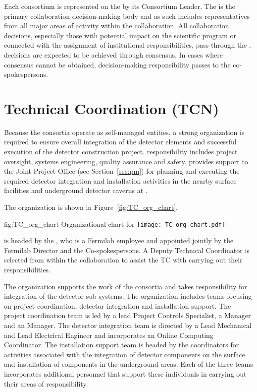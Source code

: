 Each consortium is represented on the   by
its Consortium Leader.  The   is the primary
collaboration decision-making body and as such includes
representatives from all major areas of activity within the
collaboration.  All collaboration decisions, especially those with
potential impact on the  scientific program or connected with the
assignment of institutional responsibilities, pass through the
.   decisions are expected to be
achieved through consensus.  In cases where consensus cannot be
obtained, decision-making responsibility passes to the
co-spokespersons.

\section{Technical Coordination (TCN)}
\label{sec:tc}

Because the consortia operate as self-managed entities, a strong
 organization is required to ensure 
overall integration of the detector elements and successful
execution of the detector construction project.  
responsibility includes project oversight,
systems engineering, quality assurance and safety.  
provides support to the Joint Project Office (see
Section~\ref{sec:pm}) for planning and executing the required detector
integration and installation activities in the nearby surface
facilities and underground detector caverns at \surf.

The  organization is shown in Figure~\ref{fig:TC_org_chart}.
\begin{dunefigure}{fig:TC_org_chart}
  {Organizational chart for }
  \texttt{[image: TC\_org\_chart.pdf]}
\end{dunefigure}
 is headed by the , who is a
Fermilab employee and appointed jointly by the Fermilab Director and
the  Co-spokespersons.  A Deputy Technical Coordinator is
selected from within the collaboration to assist the TC with carrying
out their responsibilities.

The  organization supports the work of the consortia and
takes responsibility for integration of the detector
sub-systems.  The organization includes teams focusing on project
coordination, detector integration and installation support.  The
project coordination team is led by a lead Project Controls
Specialist, a  Manager and an  Manager.  The
detector integration team is directed by a Lead Mechanical and Lead
Electrical Engineer and incorporates an Online Computing Coordinator.
The installation support team is headed by the coordinators for
activities associated with the integration of detector components on
the surface and installation of components in the underground areas.
Each of the three teams incorporates additional personnel that support
these individuals in carrying out their areas of responsibility.

